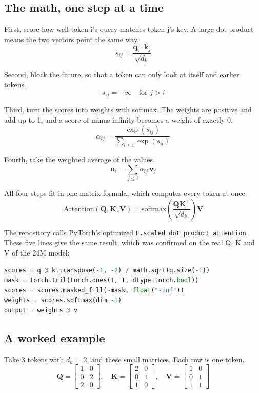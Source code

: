 \documentclass[11pt,a4paper]{article}
\newcommand{\code}[1]{\texttt{#1}}
\begin{document}
\subsection*{The math, one step at a time}
{}

First, score how well token i's query matches token j's key. A large dot product means the two vectors point the same way.
\[
s_{ij} = \frac{\mathbf{q}_i \cdot \mathbf{k}_j}{\sqrt{d_k}}
\]

Second, block the future, so that a token can only look at itself and earlier tokens.
\[
s_{ij} = -\infty \quad \text{for } j > i
\]

Third, turn the scores into weights with softmax. The weights are positive and add up to 1, and a score of minus infinity becomes a weight of exactly 0.
\[
\alpha_{ij} = \frac{\exp(s_{ij})}{\sum_{l \le i} \exp(s_{il})}
\]

Fourth, take the weighted average of the values.
\[
\mathbf{o}_i = \sum_{j \le i} \alpha_{ij}\,\mathbf{v}_j
\]

All four steps fit in one matrix formula, which computes every token at once:
\[
\mathrm{Attention}(\mathbf{Q},\mathbf{K},\mathbf{V}) = \mathrm{softmax}\!\left(\frac{\mathbf{Q}\mathbf{K}^{\top}}{\sqrt{d_k}}\right)\mathbf{V}
\]

The repository calls PyTorch's optimized \code{F.\allowbreak{}scaled\_\allowbreak{}dot\_\allowbreak{}product\_\allowbreak{}attention}. These five lines give the same result, which was confirmed on the real Q, K and V of the 24M model:

\begin{lstlisting}[language=Python]
scores = q @ k.transpose(-1, -2) / math.sqrt(q.size(-1))
mask = torch.tril(torch.ones(T, T, dtype=torch.bool))
scores = scores.masked_fill(~mask, float("-inf"))
weights = scores.softmax(dim=-1)
output = weights @ v
\end{lstlisting}

\subsection*{A worked example}
{}

Take 3 tokens with $d_k$ = 2, and these small matrices. Each row is one token.
\[
\mathbf{Q}=\begin{bmatrix}1&0\\0&2\\2&0\end{bmatrix},\quad
\mathbf{K}=\begin{bmatrix}2&0\\0&1\\1&0\end{bmatrix},\quad
\mathbf{V}=\begin{bmatrix}1&0\\0&1\\1&1\end{bmatrix}
\]
\end{document}
